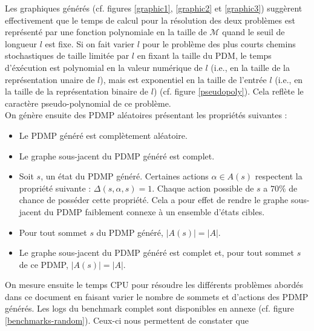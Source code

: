 \documentclass[12pt,a4paper]{report}
\theoremstyle{definition}%
\theoremstyle{remark}
\let\labelitemi\labelitemii
\begin{document}
Les graphiques générés (cf. figures \ref{graphic1}, \ref{graphic2} et
\ref{graphic3}) suggèrent effectivement que le temps de calcul pour la résolution des deux problèmes
est représenté par une fonction polynomiale en la taille de $\mathcal{M}$ quand le seuil de longueur $l$ est fixe.
Si on fait varier $l$ pour le problème des plus courts chemins stochastiques de
taille limitée par $l$ en fixant la taille du PDM, le temps d'éxécution est
polynomial en la valeur numérique de $l$ (i.e., en la taille de la représentation unaire de $l$),
mais est exponentiel en la taille de l'entrée $l$ (i.e., en la taille de la représentation binaire de $l$) (cf. figure \ref{pseudopoly}). Cela reflète le
caractère pseudo-polynomial de ce problème. \\
On génère ensuite des PDMP aléatoires présentant les propriétés suivantes :
\begin{itemize}
	\renewcommand{\labelitemi}{\tiny$\bullet$}
	\item Le PDMP généré est complètement aléatoire.
	\item Le graphe sous-jacent du PDMP généré est complet.
	\item Soit $s$, un état du PDMP généré. Certaines actions $\alpha \in A(s)$
		respectent la propriété suivante : $\Delta(s, \alpha, s) = 1$. Chaque
		action possible de $s$ a $70 \%$ de chance de posséder cette propriété.
		Cela a pour effet de rendre le graphe sous-jacent du PDMP faiblement connexe à un ensemble d'états cibles.
	\item Pour tout sommet $s$ du PDMP généré, $|A(s)| = |A|$.
	\item Le graphe sous-jacent du PDMP généré est complet et, pour tout sommet $s$ de ce PDMP, $|A(s)| = |A|$.
\end{itemize}
On mesure ensuite le temps CPU pour résoudre les différents problèmes abordés
dans ce document en faisant varier le nombre de sommets et d'actions des PDMP
générés.
Les logs du benchmark complet sont disponibles en annexe (cf. figure \ref{benchmarks-random}). Ceux-ci nous permettent de constater que
\end{document}
